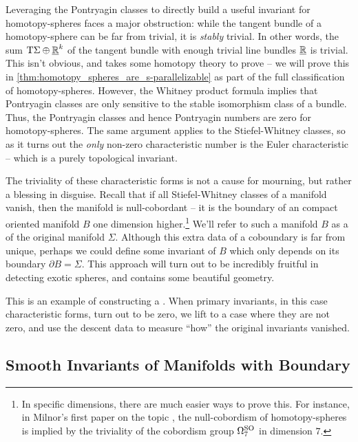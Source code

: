 Leveraging the Pontryagin classes to directly build a useful invariant for homotopy-spheres faces a major obstruction: while the tangent bundle of a homotopy-sphere can be far from trivial, it is \emph{stably} trivial. In other words, the sum $\mathrm{T} \Sigma\oplus \underline{\mathbb{R}}^k$ of the tangent bundle with enough trivial line bundles $\underline{\mathbb{R}}$ is trivial. This isn't obvious, and takes some homotopy theory to prove -- we will prove this in \cref{thm:homotopy_spheres_are_s-parallelizable} as part of the full classification of homotopy-spheres. However, the Whitney product formula implies that Pontryagin classes are only sensitive to the stable isomorphism class of a bundle. Thus, the Pontryagin classes and hence Pontryagin numbers are zero for homotopy-spheres. The same argument applies to the Stiefel-Whitney classes, so as it turns out the \emph{only} non-zero characteristic number is the Euler characteristic -- which is a purely topological invariant.

The triviality of these characteristic forms is not a cause for mourning, but rather a blessing in disguise. Recall that if all Stiefel-Whitney classes of a manifold vanish, then the manifold is null-cobordant -- it is the boundary of an compact oriented manifold $B$ one dimension higher.\footnote{In specific dimensions, there are much easier ways to prove this. For instance, in Milnor's first paper on the topic \cite{milnor1956manifolds}, the null-cobordism of homotopy-spheres is implied by the triviality of the cobordism group $\Omega^{\operatorname{SO}}_7$ in dimension $7$.} We'll refer to such a manifold $B$ as a  of the original manifold $\Sigma$. Although this extra data of a coboundary is far from unique, perhaps we could define some invariant of $B$ which only depends on its boundary $\partial B=\Sigma$. This approach will turn out to be incredibly fruitful in detecting exotic spheres, and contains some beautiful geometry.

\begin{remark} 
  This is an example of constructing a . When primary invariants, in this case characteristic forms, turn out to be zero, we lift to a case where they are not zero, and use the descent data to measure ``how'' the original invariants vanished. 
\end{remark}

\subsection*{Smooth Invariants of Manifolds with Boundary}

